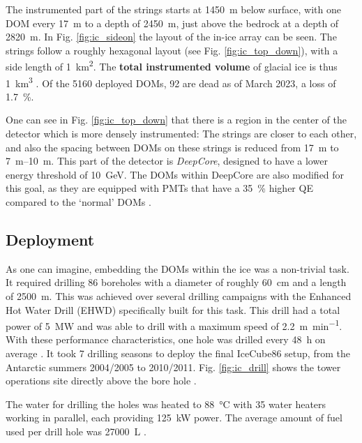 The instrumented part of the strings starts at \SI{1450}{\m} below surface, with one DOM every \SI{17}{\m} to a depth of \SI{2450}{\m}, just above the bedrock at a depth of \SI{2820}{\m}. In Fig. \ref{fig:ic_sideon} the layout of the in-ice array can be seen. The strings follow a roughly hexagonal layout (see Fig. \ref{fig:ic_top_down}), with a side length of \SI{1}{\km\squared}. The \textbf{total instrumented volume} of glacial ice is thus \SI{1}{\km\cubed} \cite{Aartsen2017}. Of the 5160 deployed DOMs, 92 are dead as of March 2023, a loss of \SI{1.7}{\percent}.

One can see in Fig. \ref{fig:ic_top_down} that there is a region in the center of the detector which is more densely instrumented: The strings are closer to each other, and also the spacing between DOMs on these strings is reduced from \SI{17}{\m} to \SIrange{7}{10}{\m}. This part of the detector is \textit{DeepCore}, designed to have a lower energy threshold of \SI{10}{\GeV}. The DOMs within DeepCore are also modified for this goal, as they are equipped with PMTs that have a \SI{35}{\percent} higher QE compared to the `normal' DOMs \cite{Aartsen2017}. 


\subsection{Deployment} 
As one can imagine, embedding the DOMs within the ice was a non-trivial task. It required drilling 86 boreholes with a diameter of roughly \SI{60}{\cm} and a length of \SI{2500}{\m}. This was achieved over several drilling campaigns with the Enhanced Hot Water Drill (EHWD) specifically built for this task. This drill had a total power of \SI{5}{\mega\W} and was able to drill with a maximum speed of \SI{2.2}{\meter\per\minute}. With these performance characteristics, one hole was drilled every \SI{48}{\hour} on average \cite{Aartsen2017}. It took 7 drilling seasons to deploy the final IceCube86 setup, from the Antarctic summers 2004/2005 to 2010/2011. Fig. \ref{fig:ic_drill} shows the tower operations site directly above the bore hole .

The water for drilling the holes was heated to \SI{88}{\celsius} with 35 water heaters working in parallel, each providing \SI{125}{\kilo\W} power. The average amount of fuel used per drill hole was \SI{27000}{\liter} \cite{Benson2014}. 

